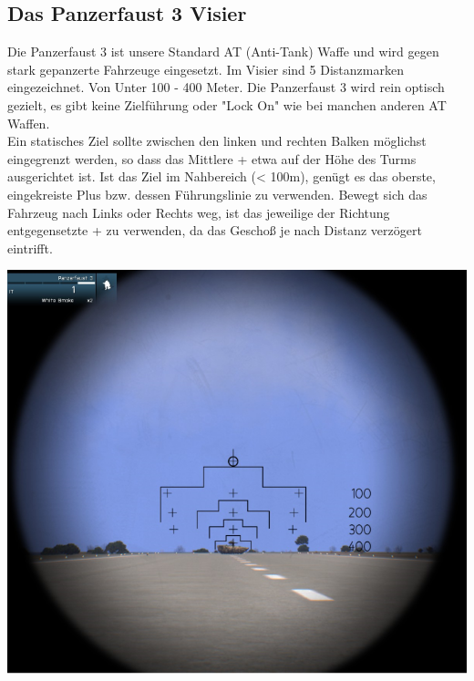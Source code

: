 \subsection{Das Panzerfaust 3 Visier}
	Die Panzerfaust 3 ist unsere Standard AT (Anti-Tank) Waffe und wird gegen stark gepanzerte Fahrzeuge eingesetzt. Im Visier sind 5 Distanzmarken eingezeichnet. Von Unter 100 - 400 Meter. Die Panzerfaust 3 wird rein optisch gezielt, es gibt keine Zielführung oder "Lock On" wie bei manchen anderen AT Waffen. \\
	Ein statisches Ziel sollte zwischen den linken und rechten Balken möglichst eingegrenzt werden, so dass das Mittlere + etwa auf der Höhe des Turms ausgerichtet ist. Ist das Ziel im Nahbereich (< 100m), genügt es das oberste, eingekreiste Plus bzw. dessen Führungslinie zu verwenden. Bewegt sich das Fahrzeug nach Links oder Rechts weg, ist das jeweilige der Richtung entgegensetzte + zu verwenden, da das Geschoß je nach Distanz verzögert eintrifft. \\

\begin{minipage}[t]{1\textwidth}
	\includegraphics[width=\textwidth]{./Grafiken/Abschnitt/Panzerfaust_Visier.png}
\end{minipage}

